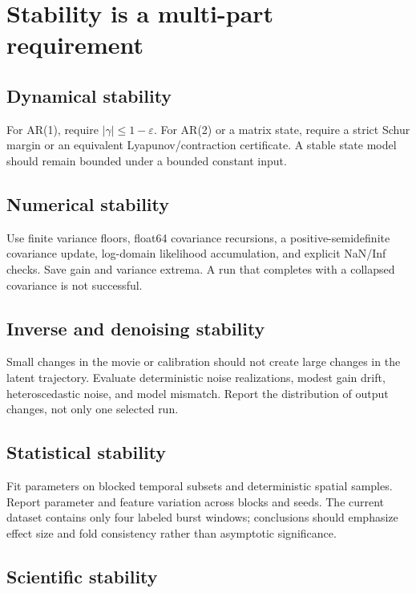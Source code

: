 \documentclass[11pt]{article}
\begin{document}
\section{Stability is a multi-part requirement}

\subsection{Dynamical stability}

For AR(1), require \(|\gamma|\leq1-\varepsilon\). For AR(2) or a matrix state,
require a strict Schur margin or an equivalent Lyapunov/contraction
certificate. A stable state model should remain bounded under a bounded
constant input.

\subsection{Numerical stability}

Use finite variance floors, float64 covariance recursions, a
positive-semidefinite covariance update, log-domain likelihood accumulation,
and explicit NaN/Inf checks. Save gain and variance extrema. A run that
completes with a collapsed covariance is not successful.

\subsection{Inverse and denoising stability}

Small changes in the movie or calibration should not create large changes in
the latent trajectory. Evaluate deterministic noise realizations, modest gain
drift, heteroscedastic noise, and model mismatch. Report the distribution of
output changes, not only one selected run.

\subsection{Statistical stability}

Fit parameters on blocked temporal subsets and deterministic spatial samples.
Report parameter and feature variation across blocks and seeds. The current
dataset contains only four labeled burst windows; conclusions should emphasize
effect size and fold consistency rather than asymptotic significance.

\subsection{Scientific stability}
\end{document}
